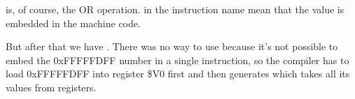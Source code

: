 ﻿




 is, of course, the OR operation.  in the instruction name mean that the value is embedded in the machine code.


But after that we have \AND. There was no way to use  because it's not possible to embed the 0xFFFFFDFF number
in a single instruction, so the compiler has to load 0xFFFFFDFF into register \$V0 first and then generates
\AND which takes all its values from registers.
